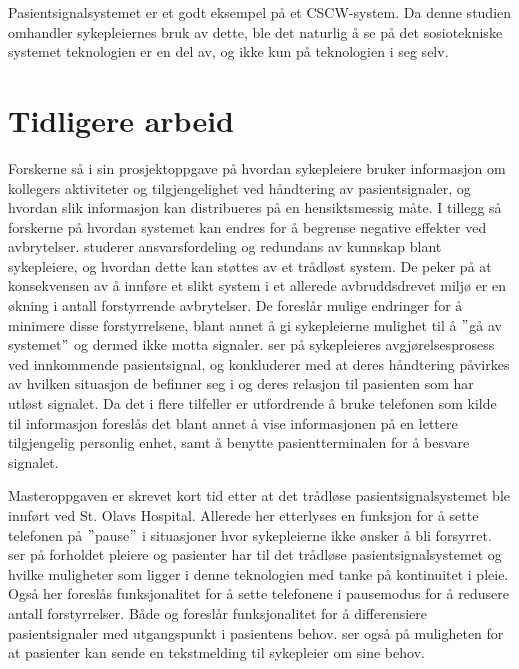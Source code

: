 \noindent
Pasientsignalsystemet er et godt eksempel på et CSCW-system. Da denne studien omhandler sykepleiernes bruk av dette, ble det naturlig å se på det sosiotekniske systemet teknologien er en del av, og ikke kun på teknologien i seg selv.

\section{Tidligere arbeid}
Forskerne så i sin prosjektoppgave \citep{Sund13} på hvordan sykepleiere bruker informasjon om kollegers aktiviteter og tilgjengelighet ved håndtering av pasientsignaler, og hvordan slik informasjon kan distribueres på en hensiktsmessig måte. I tillegg så forskerne på hvordan systemet kan endres for å begrense negative effekter ved avbrytelser. \citet{KlemetsRedundancy} studerer ansvarsfordeling og redundans av kunnskap blant sykepleiere, og hvordan dette kan støttes av et trådløst system. De peker på at konsekvensen av å innføre et slikt system i et allerede avbruddsdrevet miljø er en økning i antall forstyrrende avbrytelser. De foreslår mulige endringer for å minimere disse forstyrrelsene, blant annet å gi sykepleierne mulighet til å $"$gå av systemet$"$ og dermed ikke motta signaler. \citet{klemets13} ser på sykepleieres avgjørelsesprosess ved innkommende pasientsignal, og konkluderer med at deres håndtering påvirkes av hvilken situasjon de befinner seg i og deres relasjon til pasienten som har utløst signalet. Da det i flere tilfeller er utfordrende å bruke telefonen som kilde til informasjon foreslås det blant annet å vise informasjonen på en lettere tilgjengelig personlig enhet, samt å benytte pasientterminalen for å besvare signalet.

\noindent
Masteroppgaven \citep{Sletten09} er skrevet kort tid etter at det trådløse pasientsignalsystemet ble innført ved St. Olavs Hospital. Allerede her etterlyses en funksjon for å sette telefonen på $"$pause$"$ i situasjoner hvor sykepleierne ikke ønsker å bli forsyrret. \citet{Rygh13} ser på forholdet pleiere og pasienter har til det trådløse pasientsignalsystemet og hvilke muligheter som ligger i denne teknologien med tanke på kontinuitet i pleie. Også her foreslås funksjonalitet for å sette telefonene i pausemodus for å redusere antall forstyrrelser. Både \citet{Rygh13} og \citet{Selseth12} foreslår funksjonalitet for å differensiere pasientsignaler med utgangspunkt i pasientens behov. \citet{Selseth12} ser også på muligheten for at pasienter kan sende en tekstmelding til sykepleier om sine behov.

